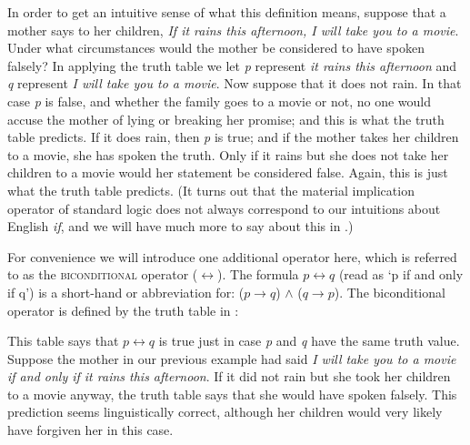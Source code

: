 In order to get an intuitive sense of what this definition means, suppose that a mother says to her children, \textit{If it rains this afternoon, I will take you to a movie}. Under what circumstances would the mother be considered to have spoken falsely? In applying the truth table we let \textit{p} represent \textit{it rains this afternoon} and \textit{q} represent \textit{I will take you to a movie}. Now suppose that it does not rain. In that case \textit{p} is false, and whether the family goes to a movie or not, no one would accuse the mother of lying or breaking her promise; and this is what the truth table predicts. If it does rain, then \textit{p} is true; and if the mother takes her children to a movie, she has spoken the truth. Only if it rains but she does not take her children to a movie would her statement be considered false. Again, this is just what the truth table predicts. (It turns out that the material implication operator of standard logic does not always correspond to our intuitions about English \textit{if}, and we will have much more to say about this in .)



For convenience we will introduce one additional operator here, which is referred to as the \textsc{biconditional} operator ($\leftrightarrow$). The formula $p\leftrightarrow q$ (read as ‘p if and only if q’) is a short-hand or abbreviation for: ($p\rightarrow q$) $\wedge$ ($q\rightarrow p$). The biconditional operator is defined by the truth table in :



This table says that $p\leftrightarrow q$ is true just in case \textit{p} and \textit{q} have the same truth value. Suppose the mother in our previous example had said \textit{I will take you to a movie if and only if it rains this afternoon}. If it did not rain but she took her children to a movie anyway, the truth table says that she would have spoken falsely. This prediction seems linguistically correct, although her children would very likely have forgiven her in this case.



